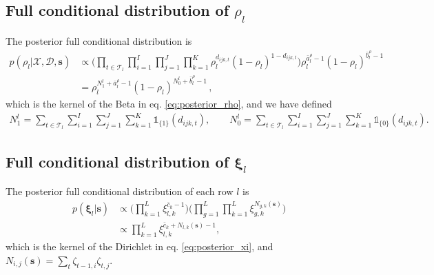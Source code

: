 \documentclass[12pt,a4paper]{article}
\def \I{\mathds{1}}
\theoremstyle{custom}
\begin{document}
\subsection{Full conditional distribution of $\rho_l$} \label{sec:posterior_rho_lGB}
The posterior full conditional distribution is
\begin{align*}
p(\rho_l|\boldsymbol{\mathcal{X}},\mathcal{D},\mathbf{s}) 
 & \propto \Bigg( \prod_{t\in\mathcal{T}_l} \prod_{i=1}^I \prod_{j=1}^J \prod_{k=1}^K \rho_l^{d_{ijk,t}} (1-\rho_l)^{1-d_{ijk,t}} \Bigg) \rho_l^{\bar{a}_l^\rho -1} (1-\rho_l)^{\bar{b}_l^\rho -1} \\
 & = \rho_l^{N_1^l + \bar{a}_l^\rho -1} (1-\rho_l)^{N_0^l + \bar{b}_l^\rho -1} \, ,
\end{align*}
which is the kernel of the Beta in eq. \eqref{eq:posterior_rho}, and we have defined
\begin{align*}
N_1^l = \sum_{t\in\mathcal{T}_l} \sum_{i=1}^I \sum_{j=1}^J \sum_{k=1}^K \I_{\lbrace 1 \rbrace}(d_{ijk,t}), \qquad N_0^l = \sum_{t\in\mathcal{T}_l} \sum_{i=1}^I \sum_{j=1}^J \sum_{k=1}^K \I_{\lbrace 0 \rbrace}(d_{ijk,t}).
\end{align*}




\subsection{Full conditional distribution of $\boldsymbol{\xi}_{l}$} \label{sec:posterior_xi_l}
The posterior full conditional distribution of each row $l$ is
\begin{align*}
p(\boldsymbol{\xi}_{l}|\mathbf{s}) & \propto \Big( \prod_{k=1}^{L} \xi_{l,k}^{\bar{c}_k-1} \Big) \Big( \prod_{g=1}^L \prod_{k=1}^L \xi_{g,k}^{N_{g,k}(\mathbf{s})} \Big) \\
 & \propto \prod_{k=1}^{L} \xi_{l,k}^{\bar{c}_k + N_{l,k}(\mathbf{s}) -1},
\end{align*}
which is the kernel of the Dirichlet in eq. \eqref{eq:posterior_xi}, and $N_{i,j}(\mathbf{s}) = \sum_t \zeta_{t-1,i} \zeta_{t,j}$.
\end{document}
